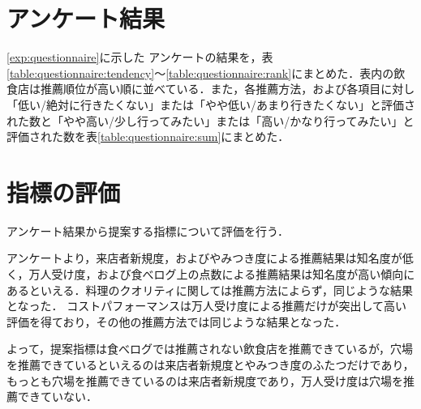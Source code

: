 	\section{アンケート結果}
	\ref{exp:questionnaire}に示した
	アンケートの結果を，表\ref{table:questionnaire:tendency}〜\ref{table:questionnaire:rank}にまとめた．表内の飲食店は推薦順位が高い順に並べている．また，各推薦方法，および各項目に対し「低い/絶対に行きたくない」または「やや低い/あまり行きたくない」と評価された数と「やや高い/少し行ってみたい」または「高い/かなり行ってみたい」と評価された数を表\ref{table:questionnaire:sum}にまとめた．
	
	
	
	
	
	
	
	\newpage

\section{指標の評価}
アンケート結果から提案する指標について評価を行う．\par
アンケートより，来店者新規度，およびやみつき度による推薦結果は知名度が低く，万人受け度，および食べログ上の点数による推薦結果は知名度が高い傾向にあるといえる．料理のクオリティに関しては推薦方法によらず，同じような結果となった．
コストパフォーマンスは万人受け度による推薦だけが突出して高い評価を得ており，その他の推薦方法では同じような結果となった．%
\par
よって，提案指標は食べログでは推薦されない飲食店を推薦できているが，穴場を推薦できているといえるのは来店者新規度とやみつき度のふたつだけであり，もっとも穴場を推薦できているのは来店者新規度であり，万人受け度は穴場を推薦できていない．
